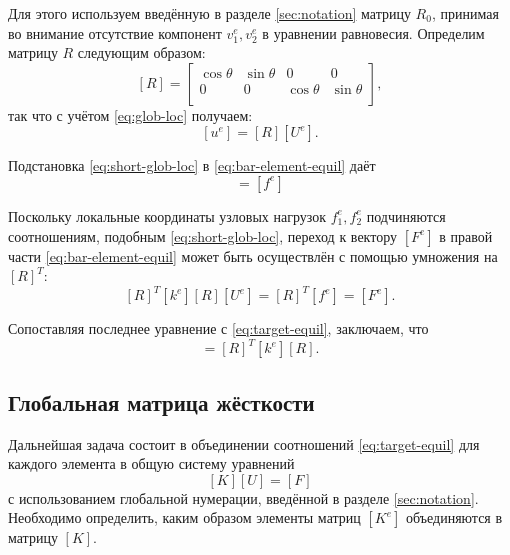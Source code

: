 \documentclass[10pt]{article}
\numberwithin{equation}{section}
\newcommand{\matr}[1]{[#1]}
\begin{document}
Для этого используем введённую в разделе \ref{sec:notation} матрицу
$R_0$, принимая во внимание отсутствие компонент $v_1^e, v_2^e$ в
уравнении равновесия. Определим матрицу $R$ следующим образом:
\begin{equation}
  \label{eq:short-rotmatrix}
  \matr{R} =
  \begin{bmatrix}
    \cos\theta & \sin\theta & 0 & 0 \\
    0 & 0 & \cos\theta & \sin\theta \\
  \end{bmatrix},
\end{equation}
так что с учётом \eqref{eq:glob-loc} получаем:
\begin{equation}
  \label{eq:short-glob-loc}
  \matr{u^e} = \matr{R}\matr{U^e}.
\end{equation}

Подстановка \eqref{eq:short-glob-loc} в \eqref{eq:bar-element-equil} даёт
\begin{equation*}
  \matr{k^e}\matr{R}\matr{U^e}=\matr{f^e}
\end{equation*}

Поскольку локальные координаты узловых нагрузок $f_1^e, f_2^e$
подчиняются соотношениям, подобным \eqref{eq:short-glob-loc}, переход
к вектору $\matr{F^e}$ в правой части \eqref{eq:bar-element-equil}
может быть осуществлён с помощью умножения на $\matr{R}^T$:
\begin{equation}
  \label{eq:bar-global-equil}
  \matr{R}^T\matr{k^e}\matr{R}\matr{U^e}=\matr{R}^T\matr{f^e} = \matr{F^e}.
\end{equation}

Сопоставляя последнее уравнение с \eqref{eq:target-equil}, заключаем,
что
\begin{equation*}
  \matr{K^e} = \matr{R}^T\matr{k^e}\matr{R}.
\end{equation*}

\subsection{Глобальная матрица жёсткости}

Дальнейшая задача состоит в объединении соотношений
\eqref{eq:target-equil} для каждого элемента в общую систему уравнений
\begin{equation}
  \label{eq:general-system}
  \matr{K}\matr{U}=\matr{F}
\end{equation}
с использованием глобальной нумерации, введённой в разделе
\ref{sec:notation}. Необходимо определить, каким образом элементы
матриц $\matr{K^e}$ объединяются в матрицу $\matr{K}$.
\end{document}
